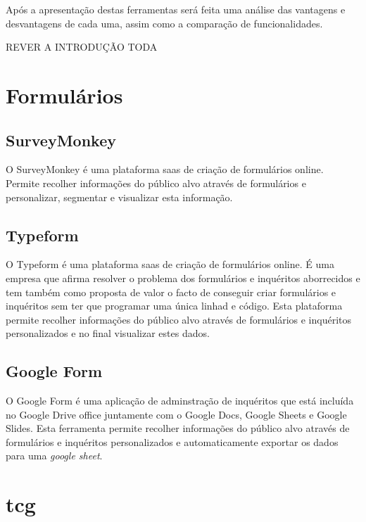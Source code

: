 Após a apresentação destas ferramentas será feita uma análise das vantagens e desvantagens de cada uma, assim como a comparação de funcionalidades.

REVER A INTRODUÇÃO TODA

\section{Formulários}
\label{formulários}

\subsection{SurveyMonkey}
\label{surveyMonkeyM}

O SurveyMonkey é uma plataforma \acrfull{saas} de criação de formulários online. Permite recolher informações do público alvo através de formulários e personalizar, segmentar e visualizar esta informação.



\subsection{Typeform}
\label{typeformM}

O Typeform é uma plataforma \acrshort{saas} de criação de formulários online. É uma empresa que afirma resolver o problema dos formulários e inquéritos aborrecidos e tem também como proposta de valor o facto de conseguir criar formulários e inquéritos sem ter que programar uma única linhad e código. Esta plataforma permite recolher informações do público alvo através de formulários e inquéritos personalizados e no final visualizar estes dados. 



\subsection{Google Form}
\label{googleformM}

O Google Form é uma aplicação de adminstração de inquéritos que está incluída no Google Drive office juntamente com o Google Docs\cite{gdocs}, Google Sheets e Google Slides\cite{gslides}. Esta ferramenta permite recolher informações do público alvo através de formulários e inquéritos personalizados e automaticamente exportar os dados para uma \textit{google sheet}.



\section{\acrfull{tcg}}
\label{sec:TCGM}

